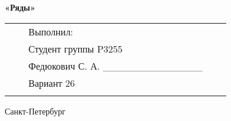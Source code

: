 \documentclass[12pt]{article}
\begin{document}
\begin{center}
		\large
		\par\bigskip
		\textbf{«Ряды»}
		\par\bigskip\par\bigskip\par\bigskip\par\bigskip\par\bigskip\par\bigskip
		\par\bigskip\par\bigskip\par\bigskip\par\bigskip\par\bigskip\par\bigskip
		\par\bigskip\par\bigskip\par\bigskip\par\bigskip\par\bigskip\par\bigskip
		\normalsize
		\begin{tabular}{lllll}
							\hspace{170pt}	 							& \hspace{80pt}	&	Выполнил:								&\\
																		&			&	Студент группы P3255					&\\
																		& 			&	Федюкович С. А. \_\_\_\_\_\_\_\_\_\_\_\_\_\_	&\\
																		&			&	Вариант 26									&\\
																		&			&										&\\
		\end{tabular}
		\par\bigskip\par\bigskip\par\bigskip                                                  
		\par\bigskip \par\bigskip
		\par\bigskip\par\bigskip\par\bigskip\par\bigskip\par\bigskip\par\bigskip\par\bigskip\par\bigskip
		
		Санкт-Петербург
		\par{}
	\end{center}
	\newpage
	\pagestyle{plain}
	\setcounter{page}{1}
\end{document}
